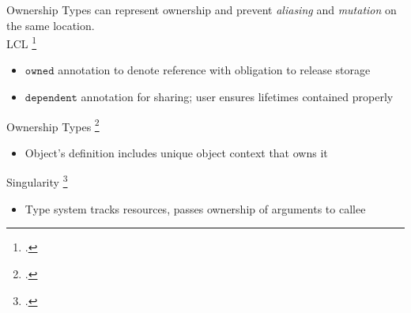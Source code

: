 \documentclass[aspectratio=169]{beamer}
\begin{document}
\begin{frame}{Ownership}
\footnotesize
   Types can represent \alert{ownership} and prevent \emph{aliasing} and \emph{mutation} on the same location.
   \\
   \vspace{0.1in}
   \pause
  LCL \footcite{evans_static_1996}
    \vspace{-0.1in}
    \begin{itemize}
        \item $\texttt{owned}$ annotation to denote reference with obligation to release storage
        \item $\texttt{dependent}$ annotation for sharing; user ensures lifetimes contained properly %
    \end{itemize}
  \pause
  Ownership Types \footcite{clarke_ownership_1998}
    \vspace{-0.1in}
    \begin{itemize}
      \item Object's definition includes \alert{unique} object context that owns it
    \end{itemize}
  \pause
  Singularity \footcite{fahndrich_language_2006}
    \vspace{-0.1in}
    \begin{itemize}
        \item Type system tracks resources, passes ownership of arguments to callee 
    \end{itemize}
  \vspace{0.1in}
\end{frame}
\end{document}
